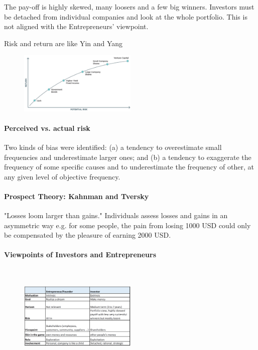 The pay-off is highly skewed, many loosers and a few big winners.
Investors must be detached from individual companies and look at the whole
portfolio. This is not aligned with the Entrepreneurs' viewpoint.

\vspace{1\baselineskip}

Risk and return are like Yin and Yang

\begin{figure}[h]
    \centering
    \includegraphics[width=0.5\textwidth]{Pictures/potential_risk_return_graph.png}
\end{figure}

\paragraph{Perceived vs. actual risk}
Two kinds of bias were identified: (a) a tendency to overestimate small frequencies
and underestimate larger ones; and (b) a tendency to exaggerate the frequency of
some specific causes and to underestimate the frequency of other, at any given level
of objective frequency.

\paragraph{Prospect Theory: Kahnman and Tversky}
"Losses loom larger than gains." Individuals assess losses and gains in an
asymmetric way e.g. for some people, the pain from losing 1000 USD could
only be compensated by the pleasure of earning 2000 USD.

\paragraph{Viewpoints of Investors and Entrepreneurs} \

\begin{figure}[h]
    \centering
    \includegraphics[width=0.5\textwidth]{Pictures/viewpoints_entrepreneurs_investors.png}
\end{figure}

